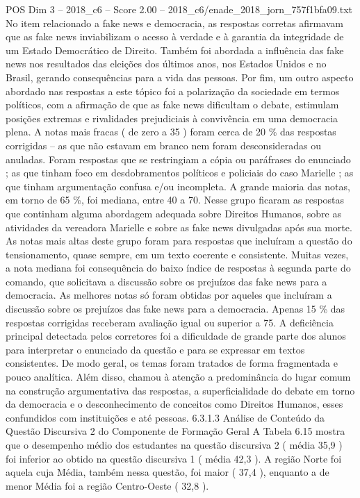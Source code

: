 \begin{textsample}{POS Dim 3 – 2018\_c6 – Score 2.00 – 2018\_c6/enade\_2018\_jorn\_757f1bfa09.txt}
No item relacionado a fake news e democracia, as respostas corretas afirmavam que as fake news inviabilizam o acesso à verdade e à garantia da integridade de um Estado Democrático de Direito.
Também foi abordada a influência das fake news nos resultados das eleições dos últimos anos, nos Estados Unidos e no Brasil, gerando consequências para a vida das pessoas.
Por fim, um outro aspecto abordado nas respostas a este tópico foi a polarização da sociedade em termos políticos, com a afirmação de que as fake news dificultam o debate, estimulam posições extremas e rivalidades prejudiciais à convivência em uma democracia plena.
A notas mais fracas ( de zero a 35 ) foram cerca de 20 \% das respostas corrigidas – as que não estavam em branco nem foram desconsideradas ou anuladas.
Foram respostas que se restringiam a cópia ou paráfrases do enunciado ; as que tinham foco em desdobramentos políticos e policiais do caso Marielle ; as que tinham argumentação confusa e/ou incompleta.
A grande maioria das notas, em torno de 65 \%, foi mediana, entre 40 a 70.
Nesse grupo ficaram as respostas que continham alguma abordagem adequada sobre Direitos Humanos, sobre as atividades da vereadora Marielle e sobre as fake news divulgadas após sua morte.
As notas mais altas deste grupo foram para respostas que incluíram a questão do tensionamento, quase sempre, em um texto coerente e consistente.
Muitas vezes, a nota mediana foi consequência do baixo índice de respostas à segunda parte do comando, que solicitava a discussão sobre os prejuízos das fake news para a democracia.
As melhores notas só foram obtidas por aqueles que incluíram a discussão sobre os prejuízos das fake news para a democracia.
Apenas 15 \% das respostas corrigidas receberam avaliação igual ou superior a 75.
A deficiência principal detectada pelos corretores foi a dificuldade de grande parte dos alunos para interpretar o enunciado da questão e para se expressar em textos consistentes.
De modo geral, os temas foram tratados de forma fragmentada e pouco analítica.
Além disso, chamou à atenção a predominância do lugar comum na construção argumentativa das respostas, a superficialidade do debate em torno da democracia e o desconhecimento de conceitos como Direitos Humanos, esses confundidos com instituições e até pessoas. 6.3.1.3 Análise de Conteúdo da Questão Discursiva 2 do Componente de Formação Geral A Tabela 6.15 mostra que o desempenho médio dos estudantes na questão discursiva 2 ( média 35,9 ) foi inferior ao obtido na questão discursiva 1 ( média 42,3 ).
A região Norte foi aquela cuja Média, também nessa questão, foi maior ( 37,4 ), enquanto a de menor Média foi a região Centro-Oeste ( 32,8 ).

\end{textsample}
